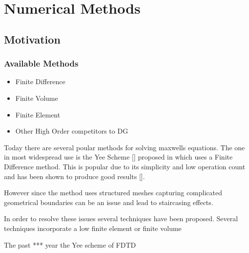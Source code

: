 
\chapter{Numerical Methods} %

\section{Motivation}
\subsection{Available Methods}
\begin{itemize}
	\item Finite Difference
	\item Finite Volume
	\item Finite Element
	\item Other High Order competitors to DG
\end{itemize}

Today there are several poular methods for solving maxwells equations. The one in most widespread use is the Yee Scheme [] proposed in which uses a Finite Difference method. This is popular due to its simplicity and low operation count and has been shown to produce good results [].

However since the method uses structured meshes capturing complicated geometrical boundaries can be an issue and lead to staircasing effects.

In order to resolve these issues several techniques have been proposed. Several techniques incorporate a low finite element or finite volume


The past *** year the Yee scheme of FDTD

